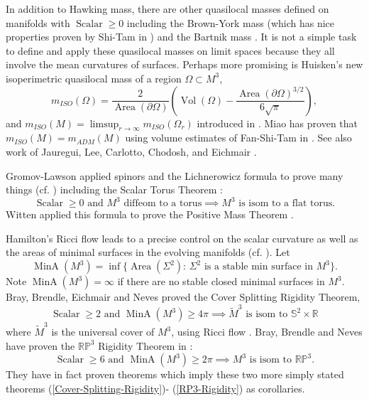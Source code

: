 \documentclass[12pt]{amsart}
\begin{document}
In addition to Hawking mass, there are other quasilocal masses defined
on manifolds with ${\operatorname{Scalar}} \ge 0$ including the Brown-York mass (which has
nice properties proven by Shi-Tam in \cite{Shi-Tam-2002}) and the Bartnik mass \cite{Bartnik}.  It is not a simple task to define and apply these quasilocal
masses on limit spaces because they all involve the mean curvatures of
surfaces.  Perhaps more promising is Huisken's new isoperimetric quasilocal mass
of a region $\Omega\subset M^3$,
\begin{equation}\label{mISO}
m_{ISO}(\Omega)=\frac{2}{{\operatorname{Area}}(\partial \Omega)}
\left({\operatorname{Vol}}(\Omega)-\frac{{\operatorname{Area}}(\partial \Omega)^{3/2}}{6 \sqrt{\pi}}\right),
\end{equation}  
and $m_{ISO}(M)= \limsup_{r\to\infty} m_{ISO}(\Omega_r)$
introduced in \cite{Huisken-isoper-talk}.   Miao has
proven that $m_{ISO}(M)= m_{ADM}(M)$ using volume
estimates of Fan-Shi-Tam in \cite{Fan-Shi-Tam}.
See also work of 
 Jauregui, Lee, Carlotto, Chodosh, and Eichmair 
\cite{Jauregui-Lee:Huisken-isoper} \cite{Carlotto-Chodosh-Eichmair}.   
  
Gromov-Lawson applied spinors and the Lichnerowicz formula to prove many things (cf. \cite{Spin-Geometry}) including
the Scalar Torus Theorem \cite{Gromov-Lawson-1980}: 
\begin{equation}\label{Torus-Rigidity}
{\operatorname{Scalar}} \ge 0 \textrm{ and }M^3 \textrm{ diffeom to a torus}  \implies 
M^3 \textrm{ is isom to a flat torus}.   
\end{equation}
Witten applied 
this formula to prove the Positive Mass Theorem \cite{Witten-PMT}.  

Hamilton's Ricci flow leads to a precise control on the scalar curvature 
as well as the areas of minimal surfaces in the evolving manifolds (cf. \cite{Hamilton-survey-95}). 
 Let
\begin{equation}\label{mina}
{\operatorname{MinA}}(M^3) = \inf\{ {\operatorname{Area}}(\Sigma^2):
\, \Sigma^2 \textrm{ is a stable min surface in } M^3 \}.
\end{equation}
Note ${\operatorname{MinA}}(M^3)=\infty$ if there are no stable closed minimal surfaces in $M^3$.
Bray, Brendle, Eichmair and Neves proved the
Cover Splitting
Rigidity Theorem,
\begin{equation} \label{Cover-Splitting-Rigidity}
{\operatorname{Scalar}} \ge 2 \textrm{ and }{\operatorname{MinA}}(M^3)\ge 4\pi
\implies \tilde{M}^3 \textrm{ is isom to }\mathbb{S}^2\times \mathbb{R}
\end{equation}
where $\tilde{M}^3$ is the universal cover of $M^3$, using Ricci flow  \cite{BBEN-CPAM-10}.
Bray, Brendle and Neves have proven the
$\mathbb{RP}^3$ Rigidity
Theorem in \cite{BBN-CAG-10}:
\begin{equation} \label{RP3-Rigidity}
{\operatorname{Scalar}} \ge 6 \textrm{ and } {\operatorname{MinA}}(M^3) \ge 2\pi
\implies M^3 \textrm{ is isom to } \mathbb{RP}^3 .
\end{equation}
They have in fact proven theorems which imply these two more simply
stated theorems (\ref{Cover-Splitting-Rigidity})- (\ref{RP3-Rigidity}) as corollaries.
\end{document}
